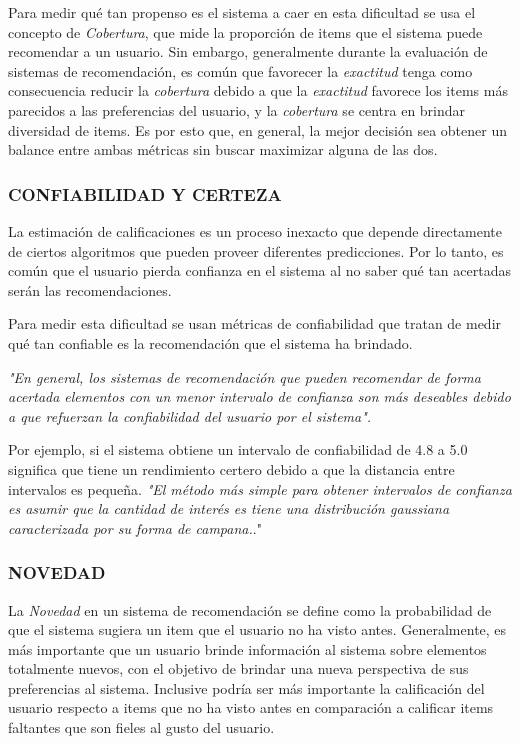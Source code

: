     Para medir qué tan propenso es el sistema a caer en esta dificultad se usa el concepto de \textit{Cobertura}, que mide la proporción de items que el sistema puede recomendar a un usuario.
    Sin embargo, generalmente durante la evaluación de sistemas de recomendación, es común que favorecer la \textit{exactitud} tenga como consecuencia reducir la \textit{cobertura} debido a que la \textit{exactitud} favorece los items más parecidos a las preferencias del usuario, y la \textit{cobertura} se centra en brindar diversidad de items. Es por esto que, en general, la mejor decisión sea obtener un balance entre ambas métricas sin buscar maximizar alguna de las dos.

    \subsubsection{CONFIABILIDAD Y CERTEZA }

    La estimación de calificaciones es un proceso inexacto que depende directamente de ciertos algoritmos que pueden proveer diferentes predicciones. Por lo tanto, es común que el usuario pierda confianza en el sistema al no saber qué tan acertadas serán las recomendaciones.

    Para medir esta dificultad se usan métricas de confiabilidad que tratan de medir qué tan confiable es la recomendación que el sistema ha brindado.

    \textit{"En general, los sistemas de recomendación que pueden recomendar de forma acertada elementos con un menor intervalo de confianza son más deseables debido a que refuerzan la confiabilidad del usuario por el sistema".} \parencite{Aggarwal2016}

    Por ejemplo, si el sistema obtiene un intervalo de confiabilidad de 4.8 a 5.0 significa que tiene un rendimiento certero debido a que la distancia entre intervalos es pequeña. \textit{"El método más simple para obtener intervalos de confianza es asumir que la cantidad de interés es tiene una distribución gaussiana  caracterizada por su forma de campana.}." \parencite{10.5555/1941884}

    \newpage
    \thispagestyle{plain}
    \vspace*{0.2cm}

    \subsubsection{NOVEDAD}

    La \textit{Novedad} en un sistema de recomendación se define como la probabilidad de que el sistema sugiera un item que el usuario no ha visto antes.
    Generalmente, es más importante que un usuario brinde información al sistema sobre elementos totalmente nuevos, con el objetivo de brindar una nueva perspectiva de sus preferencias al sistema. Inclusive podría ser más importante la calificación del usuario respecto a items que no ha visto antes en comparación a calificar items faltantes que son fieles al gusto del usuario. 

